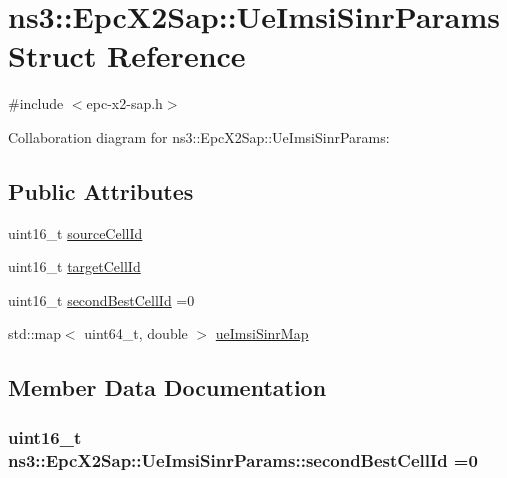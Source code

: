\hypertarget{structns3_1_1EpcX2Sap_1_1UeImsiSinrParams}{}\section{ns3\+:\+:Epc\+X2\+Sap\+:\+:Ue\+Imsi\+Sinr\+Params Struct Reference}
\label{structns3_1_1EpcX2Sap_1_1UeImsiSinrParams}


{\ttfamily \#include $<$epc-\/x2-\/sap.\+h$>$}



Collaboration diagram for ns3\+:\+:Epc\+X2\+Sap\+:\+:Ue\+Imsi\+Sinr\+Params\+:
\subsection*{Public Attributes}
\begin{DoxyCompactItemize}
\item 
uint16\+\_\+t \hyperlink{structns3_1_1EpcX2Sap_1_1UeImsiSinrParams_a5d24974fd386fe67a19f3880d41911d8}{source\+Cell\+Id}
\item 
uint16\+\_\+t \hyperlink{structns3_1_1EpcX2Sap_1_1UeImsiSinrParams_a29c9f622ca47fd3dced9e599a279403e}{target\+Cell\+Id}
\item 
uint16\+\_\+t \hyperlink{structns3_1_1EpcX2Sap_1_1UeImsiSinrParams_aac756fa304c712951e5631f36a754563}{second\+Best\+Cell\+Id} =0
\item 
std\+::map$<$ uint64\+\_\+t, double $>$ \hyperlink{structns3_1_1EpcX2Sap_1_1UeImsiSinrParams_a9d0b6d3df52a5db038673a7ef2e01d29}{ue\+Imsi\+Sinr\+Map}
\end{DoxyCompactItemize}


\subsection{Member Data Documentation}
\subsubsection[{\texorpdfstring{second\+Best\+Cell\+Id}{secondBestCellId}}]{\setlength{\rightskip}{0pt plus 5cm}uint16\+\_\+t ns3\+::\+Epc\+X2\+Sap\+::\+Ue\+Imsi\+Sinr\+Params\+::second\+Best\+Cell\+Id =0}\hypertarget{structns3_1_1EpcX2Sap_1_1UeImsiSinrParams_aac756fa304c712951e5631f36a754563}{}\label{structns3_1_1EpcX2Sap_1_1UeImsiSinrParams_aac756fa304c712951e5631f36a754563}
